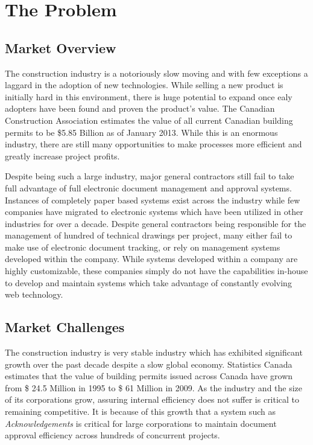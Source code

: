 \section{The Problem}

\subsection{Market Overview}
The construction industry is a notoriously slow moving and with few exceptions a laggard in the adoption of new technologies. While selling a new product is initially hard in this environment, there is huge potential to expand once ealy adopters have been found and proven the product's value. The Canadian Construction Association estimates the value of all current Canadian building permits to be \$5.85 Billion as of January 2013. While this is an enormous industry, there are still many opportunities to make processes more efficient and greatly increase project profits.

Despite being such a large industry, major general contractors still fail to take full advantage of full electronic document management and approval systems. Instances of completely paper based systems exist across the industry while few companies have migrated to electronic systems which have been utilized in other industries for over a decade. Despite general contractors being responsible for the management of hundred of technical drawings per project, many either fail to make use of electronic document tracking, or rely on management systems developed within the company. While systems developed within a company are highly customizable, these companies simply do not have the capabilities in-house to develop and maintain systems which take advantage of constantly evolving web technology.

\subsection{Market Challenges}

The construction industry is very stable industry which has exhibited significant growth over the past decade despite a slow global economy. Statistics Canada estimates that the value of building permits issued across Canada have grown from \$ 24.5 Million in 1995 to \$ 61 Million in 2009. As the industry and the size of its corporations grow, assuring internal efficiency does not suffer is critical to remaining competitive. It is because of this growth that a system such as {\it Acknowledgements} is critical for large corporations to maintain document approval efficiency across hundreds of concurrent projects.

